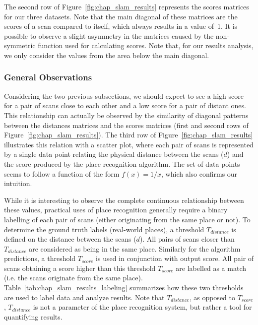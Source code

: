 The second row of Figure~\ref{fig:chap_slam_results} represents the scores matrices for our three datasets. Note that the main diagonal of these matrices are the scores of a scan compared to itself, which always results in a value of~1. It is possible to observe a slight asymmetry in the matrices caused by the non-symmetric function used for calculating scores. Note that, for our results analysis, we only consider the values from the area below the main diagonal.


\subsubsection{General Observations}
\label{ssec:chap_slam_results_evaluation}

Considering the two previous subsections, we should expect to see a high score for a pair of scans close to each other and a low score for a pair of distant ones. This relationship can actually be observed by the similarity of diagonal patterns between the distances matrices and the scores matrices (first and second rows of Figure~\ref{fig:chap_slam_results}). The third row of Figure~\ref{fig:chap_slam_results} illustrates this relation with a scatter plot, where each pair of scans is represented by a single data point relating the physical distance between the scans ($d$) and the score produced by the place recognition algorithm. The set of data points seems to follow a function of the form $f(x) = 1 / x$, which also confirms our intuition.

While it is interesting to observe the complete continuous relationship between these values, practical uses of place recognition generally require a binary labelling of each pair of scans (either originating from the same place or not). To determine the ground truth labels (real-world places), a threshold $T_{distance}$ is defined on the distance between the scans ($d$). All pairs of scans closer than $T_{distance}$ are considered as being in the same place. Similarly for the algorithm predictions, a threshold $T_{score}$ is used in conjunction with output score. All pair of scans obtaining a score higher than this threshold $T_{score}$ are labelled as a match (i.e. the scans originate from the same place). Table~\ref{tab:chap_slam_results_labeling} summarizes how these two thresholds are used to label data and analyze results. Note that $T_{distance}$, as opposed to $T_{score}$, $T_{distance}$ is not a parameter of the place recognition system, but rather a tool for quantifying results. 

